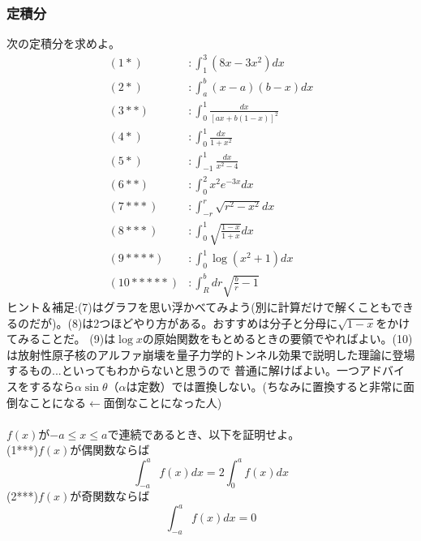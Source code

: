 \documentclass[a4j,dvipdfmx]{jsarticle}
\begin{document}
\subsubsection*{定積分}
次の定積分を求めよ。
\begin{align*}
    (1*)&:\int_1^3(8x-3x^2)dx\\
    (2*)&:\int_a^b (x-a)(b-x)dx\\
    (3**)&:\int_0^1\frac{dx}{[ax+b(1-x)]^2}\\
    (4*)&:\int_0^1\frac{dx}{1+x^2}\\
    (5*)&:\int_{-1}^1\frac{dx}{x^2-4}\\
    (6**)&:\int_0^2x^2e^{-3x}dx\\
    (7***)&:\int_{-r}^r\sqrt{r^2-x^2}dx\\
    (8***)&:\int_0^1\sqrt{\frac{1-x}{1+x}}dx\\
    (9****)&:\int_0^1\log(x^2+1)dx\\
    (10*****)&:\int_R^bdr\sqrt{\frac{b}{r}-1}
\end{align*}
\scriptsize
ヒント＆補足:(7)はグラフを思い浮かべてみよう(別に計算だけで解くこともできるのだが)。(8)は2つほどやり方がある。おすすめは分子と分母に$\sqrt{1-x}$をかけてみることだ。
(9)は$\log x$の原始関数をもとめるときの要領でやればよい。(10)は放射性原子核のアルファ崩壊を量子力学的トンネル効果で説明した理論に登場するもの...といってもわからないと思うので
普通に解けばよい。一つアドバイスをするなら$\alpha\sin \theta$（$\alpha$は定数）では置換しない。(ちなみに置換すると非常に面倒なことになる$\leftarrow$面倒なことになった人)\\
\\

\normalsize
$f(x)$が$-a\leq x \leq a$で連続であるとき、以下を証明せよ。\\
(1***)$f(x)$が偶関数ならば
\begin{equation*}
    \int_{-a}^af(x)dx=2\int_0^af(x)dx
\end{equation*}
(2***)$f(x)$が奇関数ならば
\begin{equation*}
    \int_{-a}^af(x)dx=0
\end{equation*}
\footnotesize
\end{document}
